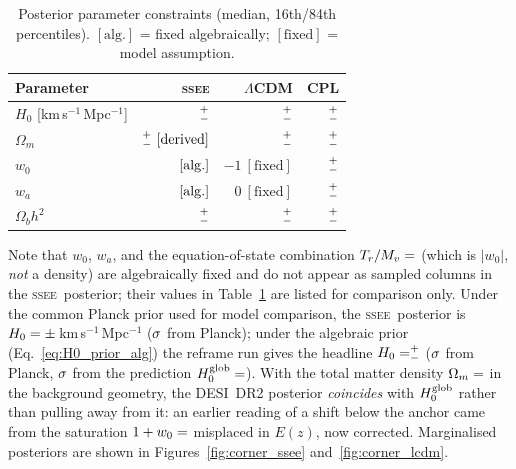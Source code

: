 \documentclass[12pt,a4paper]{article}
\newcommand{\SSEE}{\ifmmode\mathrm{SSEE}\else\textsc{ssee}\fi}
\newcommand{\LCDM}{\ifmmode\Lambda\mathrm{CDM}\else$\Lambda$CDM\fi}
\newcommand{\wz}{w_0}
\newcommand{\wa}{w_a}
\newcommand{\HZeroPosterior}{\val{h0_p2}^{+\val{h0_p2_mas}}_{-\val{h0_p2_menos}}}
\begin{document}
\begin{table}[H]
\centering
\caption{Posterior parameter constraints (median, 16th/84th percentiles).
$[\mathrm{alg.}]$ = fixed algebraically; $[\mathrm{fixed}]$ = model assumption.}
\label{tab:posteriors}
\begin{tabular}{lrrr}
\toprule
Parameter & \SSEE & \LCDM & CPL \\
\midrule
$H_0$ [km\,s$^{-1}$\,Mpc$^{-1}$]
  & $\val{p2_ssee_H0_mediana}^{+\val{p2_ssee_H0_mas}}_{-\val{p2_ssee_H0_menos}}$
  & $\val{p2_lcdm_H0_mediana}^{+\val{p2_lcdm_H0_mas}}_{-\val{p2_lcdm_H0_menos}}$
  & $\val{p2_cpl_H0_mediana}^{+\val{p2_cpl_H0_mas}}_{-\val{p2_cpl_H0_menos}}$ \\[3pt]
$\Omega_m$
  & $\val{p2_ssee_Om_mediana}^{+\val{p2_ssee_Om_mas}}_{-\val{p2_ssee_Om_menos}}\ [\mathrm{derived}]$
  & $\val{p2_lcdm_Om_mediana}^{+\val{p2_lcdm_Om_mas}}_{-\val{p2_lcdm_Om_menos}}$
  & $\val{p2_cpl_Om_mediana}^{+\val{p2_cpl_Om_mas}}_{-\val{p2_cpl_Om_menos}}$ \\[3pt]
$\wz$
  & $\val{W0_d3}\ [\mathrm{alg.}]$
  & $-1\ [\mathrm{fixed}]$
  & $\val{p2_cpl_w0_mediana}^{+\val{p2_cpl_w0_mas}}_{-\val{p2_cpl_w0_menos}}$ \\[3pt]
$\wa$
  & $\val{WA_d3}\ [\mathrm{alg.}]$
  & $0\ [\mathrm{fixed}]$
  & $\val{p2_cpl_wa_mediana}^{+\val{p2_cpl_wa_mas}}_{-\val{p2_cpl_wa_menos}}$ \\[3pt]
$\Omega_b h^2$
  & $\val{p2_ssee_obh2_mediana}^{+\val{p2_ssee_obh2_mas}}_{-\val{p2_ssee_obh2_menos}}$
  & $\val{p2_lcdm_obh2_mediana}^{+\val{p2_lcdm_obh2_mas}}_{-\val{p2_lcdm_obh2_menos}}$
  & $\val{p2_cpl_obh2_mediana}^{+\val{p2_cpl_obh2_mas}}_{-\val{p2_cpl_obh2_menos}}$ \\
\bottomrule
\end{tabular}
\end{table}

Note that $\wz$, $\wa$, and the equation-of-state combination
$T_r/M_v=\val{S_DE_d6}$ (which is $|w_0|$, \emph{not} a density) are algebraically
fixed and do not appear as sampled columns in the \SSEE\ posterior; their
values in Table~\ref{tab:posteriors} are listed for comparison only.
Under the common Planck prior used for model comparison, the \SSEE\ posterior
is $H_0=\val{p2_ssee_H0_mediana}\pm\val{p2_ssee_H0_std}$\,km\,s$^{-1}$\,Mpc$^{-1}$ ($\val{p2_tH0_planck}\sigma$ from Planck);
under the algebraic prior (Eq.~\ref{eq:H0_prior_alg}) the reframe run gives the
headline $H_0=\HZeroPosterior$ ($\val{h0_p2_dplanck}\sigma$ from Planck, $\val{h0_p2_dhglob}\sigma$ from the
prediction $H_0^{\rm glob}=\val{H0_GLOBAL_d3}$). With the total matter density
$\Omega_m=\val{OMEGA_M_TOTAL_d6}$ in the background geometry, the DESI~DR2 posterior
\emph{coincides} with $H_0^{\rm glob}$ rather than pulling away from it: an
earlier reading of a shift below the anchor came from the saturation
$1+w_0=\val{S_M_d6}$ misplaced in $E(z)$, now corrected. Marginalised posteriors are shown in
Figures~\ref{fig:corner_ssee} and~\ref{fig:corner_lcdm}.
\end{document}
